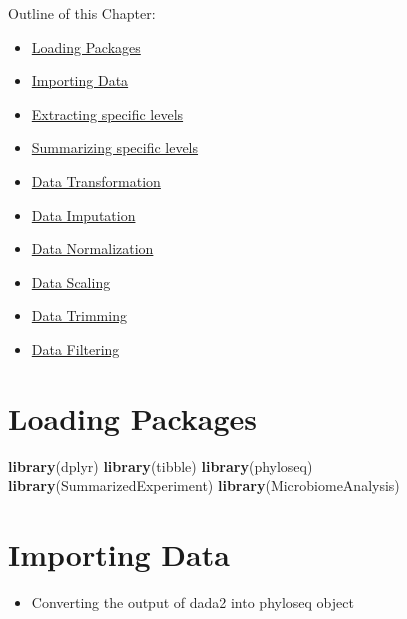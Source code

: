 \documentclass[
]{book}
\newenvironment{Shaded}{\begin{snugshade}}{\end{snugshade}}
\newcommand{\FunctionTok}[1]{\textcolor[rgb]{0.13,0.29,0.53}{\textbf{#1}}}
\newcommand{\NormalTok}[1]{#1}
\providecommand{\tightlist}{%
  \setlength{\itemsep}{0pt}\setlength{\parskip}{0pt}}
\begin{document}
Outline of this Chapter:

\begin{itemize}
\item
  \protect\hyperlink{loading-packages}{Loading Packages}
\item
  \protect\hyperlink{importing-data}{Importing Data}
\item
  \protect\hyperlink{extracting-specific-levels}{Extracting specific levels}
\item
  \protect\hyperlink{summarizing-specific-levels}{Summarizing specific levels}
\item
  \protect\hyperlink{data-transformation}{Data Transformation}
\item
  \protect\hyperlink{data-imputation}{Data Imputation}
\item
  \protect\hyperlink{data-normalization}{Data Normalization}
\item
  \protect\hyperlink{data-scaling}{Data Scaling}
\item
  \protect\hyperlink{data-trimming}{Data Trimming}
\item
  \protect\hyperlink{data-filtering}{Data Filtering}
\end{itemize}

\hypertarget{loading-packages}{%
\section{Loading Packages}\label{loading-packages}}

\begin{Shaded}
\begin{Highlighting}[]
\FunctionTok{library}\NormalTok{(dplyr)}
\FunctionTok{library}\NormalTok{(tibble)}
\FunctionTok{library}\NormalTok{(phyloseq)}
\FunctionTok{library}\NormalTok{(SummarizedExperiment)}
\FunctionTok{library}\NormalTok{(MicrobiomeAnalysis)}
\end{Highlighting}
\end{Shaded}

\hypertarget{importing-data}{%
\section{Importing Data}\label{importing-data}}

\begin{itemize}
\tightlist
\item
  Converting the output of dada2 into phyloseq object
\end{itemize}
\end{document}
